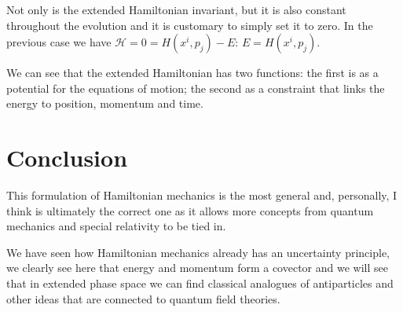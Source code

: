 \documentclass[aps,pra,10pt,floatfix,nofootinbib]{revtex4-1}
\theoremstyle{definition}
\begin{document}
Not only is the extended Hamiltonian invariant, but it is also constant throughout the evolution and it is customary to simply set it to zero. In the previous case we have $\mathcal{H} = 0 = H(x^i,p_j) - E$: $E = H(x^i,p_j)$.

We can see that the extended Hamiltonian has two functions: the first is as a potential for the equations of motion; the second as a constraint that links the energy to position, momentum and time.

\section{Conclusion}

This formulation of Hamiltonian mechanics is the most general and, personally, I think is ultimately the correct one as it allows more concepts from quantum mechanics and special relativity to be tied in.

We have seen how Hamiltonian mechanics already has an uncertainty principle, we clearly see here that energy and momentum form a covector and we will see that in extended phase space we can find classical analogues of antiparticles and other ideas that are connected to quantum field theories.
\end{document}
